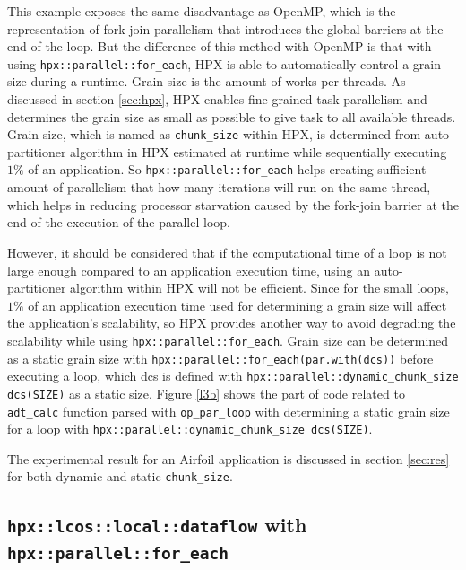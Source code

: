 \documentclass[conference]{IEEEtran}
\begin{document}
This example exposes the same disadvantage as OpenMP, which is the representation of fork-join parallelism that introduces the global barriers at the end of the loop. But the difference of this method with OpenMP is that with using \texttt{hpx::parallel::for\_each}, HPX is able to automatically control a grain size during a runtime. Grain size is the amount of works per threads. As discussed in section \ref{sec:hpx}, HPX enables fine-grained task parallelism and determines the grain size as small as possible to give task to all available threads. Grain size, which is named as \texttt{chunk\_size} within HPX, is determined from auto-partitioner algorithm in HPX estimated at runtime while sequentially executing $1\%$ of an application. So \texttt{hpx::parallel::for\_each} helps creating sufficient amount of parallelism that how many iterations will run on the same thread, which helps in reducing processor starvation caused by the fork-join barrier at the end of the execution of the parallel loop. 

However, it should be considered that if the computational time of a loop is not large enough compared to an application execution time, using an auto-partitioner algorithm within HPX will not be efficient. Since for the small loops, $1\%$ of an application execution time used for determining a grain size will affect the application's scalability, so HPX provides another way to avoid degrading the scalability while using \texttt{hpx::parallel::for\_each}. Grain size can be determined as a static grain size with \texttt{hpx::parallel::for\_each(par.with(dcs))} before executing a loop, which dcs is defined with \texttt{hpx::parallel::dynamic\_chunk\_size dcs(SIZE)} as a static size.  Figure \ref{l3b} shows the part of code related to \texttt{adt\_calc} function parsed with \texttt{op\_par\_loop} with determining a static grain size for a loop with \texttt{hpx::parallel::dynamic\_chunk\_size dcs(SIZE)}. 


The experimental result for an Airfoil application is discussed in section \ref{sec:res} for both dynamic and static \texttt{chunk\_size}.








\subsection{\texttt{hpx::lcos::local::dataflow} with \texttt{hpx::parallel::for\_each}}
\label{sec:async}
\end{document}
